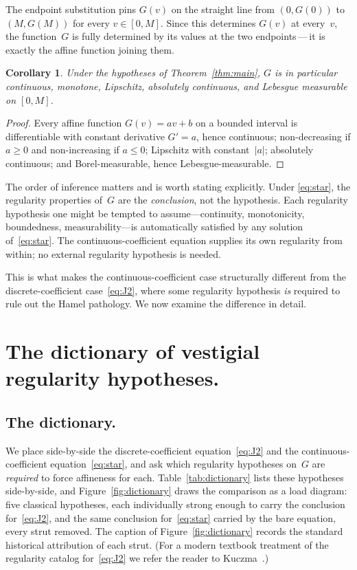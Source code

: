 \documentclass{article}
\theoremstyle{plain}
\newtheorem{corollary}[theorem]{Corollary}
\theoremstyle{definition}
\begin{document}
The endpoint substitution pins $G(v)$ on the straight line from
$(0,G(0))$ to $(M,G(M))$ for every $v\in[0,M]$. Since this determines
$G(v)$ at every~$v$, the function~$G$ is fully determined by its values
at the two endpoints\,---\,it is exactly the affine function joining them.

\begin{corollary}\label{cor:regularity}
Under the hypotheses of Theorem~\ref{thm:main}, $G$ is in particular
continuous, monotone, Lipschitz, absolutely continuous, and
Lebesgue measurable on $[0,M]$.
\end{corollary}

\begin{proof}
Every affine function $G(v)=av+b$ on a bounded interval is differentiable
with constant derivative $G'=a$, hence continuous; non-decreasing if
$a\ge0$ and non-increasing if $a\le0$; Lipschitz with constant~$|a|$;
absolutely continuous; and Borel-measurable, hence Lebesgue-measurable.
\end{proof}

The order of inference matters and is worth stating explicitly. Under
\eqref{eq:star}, the regularity properties of~$G$ are the
\emph{conclusion}, not the hypothesis. Each regularity hypothesis one
might be tempted to assume---continuity, monotonicity, boundedness,
measurability---is automatically satisfied by any solution
of~\eqref{eq:star}. The continuous-coefficient equation supplies its own
regularity from within; no external regularity hypothesis is needed.

This is what makes the continuous-coefficient case structurally different
from the discrete-coefficient case~\eqref{eq:J2}, where some regularity
hypothesis \emph{is} required to rule out the Hamel pathology. We now
examine the difference in detail.

\section{The dictionary of vestigial regularity hypotheses.}
\label{sec:dictionary}

\subsection{The dictionary.}
\label{ssec:dict-table}

We place side-by-side the discrete-coefficient equation~\eqref{eq:J2}
and the continuous-coefficient equation~\eqref{eq:star}, and ask which
regularity hypotheses on~$G$ are \emph{required} to force affineness
for each. Table~\ref{tab:dictionary} lists these hypotheses side-by-side,
and Figure~\ref{fig:dictionary} draws the comparison as a load
diagram: five classical hypotheses, each individually strong enough
to carry the conclusion for~\eqref{eq:J2}, and the same conclusion
for~\eqref{eq:star} carried by the bare equation, every strut
removed. The caption of Figure~\ref{fig:dictionary} records the standard historical attribution of
each strut. (For a modern textbook treatment of the regularity
catalog for~\eqref{eq:J2} we refer the reader to
Kuczma~\cite[\S13.2]{Kuczma2009}.)
\end{document}
